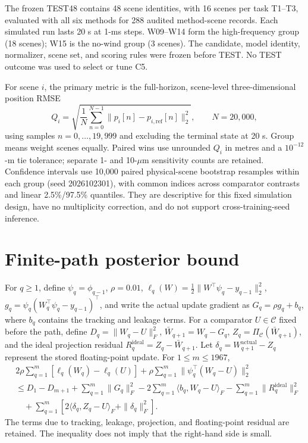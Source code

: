 \documentclass[11pt]{article}
\newcommand{\Cset}{\mathcal{C}}
\begin{document}
The frozen TEST48 contains 48 scene identities, with 16 scenes per task T1--T3, evaluated with all six methods for 288 audited method-scene records. Each simulated run lasts 20 s at 1-ms steps. W09--W14 form the high-frequency group (18 scenes); W15 is the no-wind group (3 scenes). The candidate, model identity, normalizer, scene set, and scoring rules were frozen before TEST. No TEST outcome was used to select or tune C5.

For scene $i$, the primary metric is the full-horizon, scene-level three-dimensional position RMSE
\begin{equation}
  Q_i=\sqrt{\frac{1}{N}\sum_{n=0}^{N-1}
      \|p_i[n]-p_{i,\mathrm{ref}}[n]\|_2^2},
  \qquad N=20{,}000,
  \label{eq:q}
\end{equation}
using samples $n=0,\ldots,19{,}999$ and excluding the terminal state at 20 s. Group means weight scenes equally. Paired wins use unrounded $Q_i$ in metres and a $10^{-12}$-m tie tolerance; separate 1- and 10-$\mu$m sensitivity counts are retained. Confidence intervals use 10,000 paired physical-scene bootstrap resamples within each group (seed 2026102301), with common indices across comparator contrasts and linear 2.5\%/97.5\% quantiles. They are descriptive for this fixed simulation design, have no multiplicity correction, and do not support cross-training-seed inference.

\section{Finite-path posterior bound}
For $q\geq1$, define $\psi_q=\phi_{q-1}$, $\rho=0.01$, $\ell_q(W)=\tfrac12\|W^\top\psi_q-y_{q-1}\|_2^2$, $g_q=\psi_q(W_q^\top\psi_q-y_{q-1})^\top$, and write the actual update gradient as $G_q=\rho g_q+b_q$, where $b_q$ contains the tracking and leakage terms. For a comparator $U\in\Cset$ fixed before the path, define $D_q=\|W_q-U\|_F^2$, $\bar W_{q+1}=W_q-G_q$, $Z_q=\Pi_{\Cset}(\bar W_{q+1})$, and the ideal projection residual $R_q^{\mathrm{ideal}}=Z_q-\bar W_{q+1}$. Let $\delta_q=W_{q+1}^{\mathrm{actual}}-Z_q$ represent the stored floating-point update. For $1\leq m\leq1967$,
\begin{equation}
\begin{aligned}
&2\rho\sum_{q=1}^{m}[\ell_q(W_q)-\ell_q(U)]
+\rho\sum_{q=1}^{m}\|\psi_q^\top(W_q-U)\|_2^2 \\
&\leq D_1-D_{m+1}+\sum_{q=1}^{m}\|G_q\|_F^2
-2\sum_{q=1}^{m}\langle b_q,W_q-U\rangle_F
-\sum_{q=1}^{m}\|R_q^{\mathrm{ideal}}\|_F^2 \\
&\quad+\sum_{q=1}^{m}\left[2\langle\delta_q,Z_q-U\rangle_F+\|\delta_q\|_F^2\right].
\end{aligned}
\label{eq:path-bound}
\end{equation}
The terms due to tracking, leakage, projection, and floating-point residual are retained. The inequality does not imply that the right-hand side is small.
\end{document}
